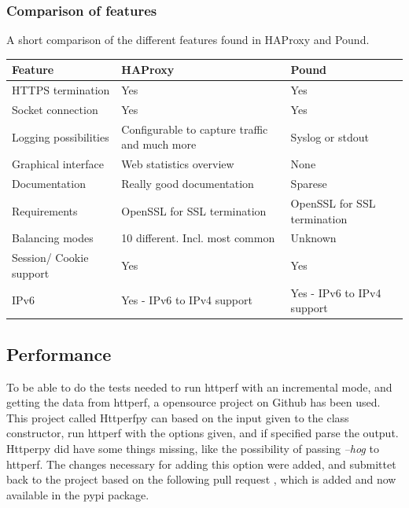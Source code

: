 \subsubsection{Comparison of features}
A short comparison of the different features found in HAProxy and Pound.
\begin{table}[h]
\begin{tabular}{lll}
\hline
Feature                 & HAProxy                                       & Pound                       \\ \hline
HTTPS termination       & Yes                                           & Yes                         \\ \hline
Socket connection       & Yes                                           & Yes                         \\ \hline
Logging possibilities   & Configurable to capture traffic and much more & Syslog or stdout            \\ \hline
Graphical interface     & Web statistics overview                       & None                        \\ \hline
Documentation           & Really good documentation                     & Sparese                     \\ \hline
Requirements            & OpenSSL for SSL termination                   & OpenSSL for SSL termination \\ \hline
Balancing modes         & 10 different. Incl. most common               & Unknown                     \\ \hline
Session/ Cookie support & Yes                                           & Yes                         \\ \hline
IPv6                    & Yes - IPv6 to IPv4 support                    & Yes - IPv6 to IPv4 support  \\ \hline
\end{tabular}
\end{table}


\subsection{Performance}
To be able to do the tests needed to run httperf with an incremental mode, and
getting the data from httperf, a opensource project on Github has been used.
This project called Httperfpy \cite{httperfpy} can based on the input given to the class
constructor, run httperf with the options given, and if specified parse the
output. Httperpy did have some things missing, like the possibility of passing
\textit{--hog} to httperf. The changes necessary for adding this option were
added, and submittet back to the project based on the following pull request
\cite{httperfpy:pull_req}, which is added and now available in the pypi
package.

